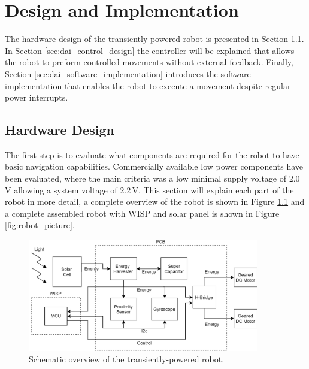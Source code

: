 \chapter{Design and Implementation}
\label{chp:design_and_implementation}

The hardware design of the transiently-powered robot is presented in Section \ref{sec:dai_hardware_design}.
In Section \ref{sec:dai_control_design} the controller will be explained that allows the robot to preform controlled movements without external feedback.
Finally, Section \ref{sec:dai_software_implementation} introduces the software implementation that enables the robot to execute a movement despite regular power interrupts. 

\section{Hardware Design}
\label{sec:dai_hardware_design}
The first step is to evaluate what components are required for the robot to have basic navigation capabilities. 
Commercially available low power components have been evaluated, where the main criteria was a low minimal supply voltage of 2.0\,V allowing a system voltage of 2.2\,V.
This section will explain each part of the robot in more detail, a complete overview of the robot is shown in Figure \ref{fig:robot_overview} and a complete assembled robot with WISP and solar panel is shown in Figure \ref{fig:robot_picture}.

\vspace{1em}
\begin{figure}[h!]
	\centering
	\includegraphics[width=0.9\textwidth]{pics/schematic_robot_v2.png}
	\caption{Schematic overview of the transiently-powered robot.}
	\label{fig:robot_overview}
\end{figure}

